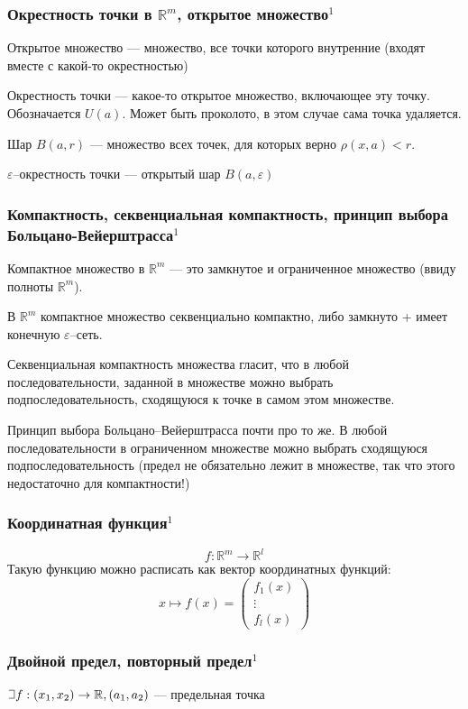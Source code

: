 \documentclass{article}
\def\letus{%
\mathord{\setbox0=\hbox{$\exists$}%
         \hbox{\kern 0.125\wd0%
               \vbox to \ht0{%
                  \hrule width 0.75\wd0%
                  \vfill%
                  \hrule width 0.75\wd0}%
               \vrule height \ht0%
               \kern 0.125\wd0}%
       }%
        }
\begin{document}
\subsubsection{Окрестность точки в \texorpdfstring{$\mathbb{R}^m$}{R\^m}, открытое множество\texorpdfstring{$^1$}{}}
Открытое множество --- множество, все точки которого внутренние (входят вместе с какой-то окрестностью)

Окрестность точки --- какое-то открытое множество, включающее эту точку. Обозначается $U(a)$. Может быть проколото, в этом случае сама точка удаляется. 

Шар $B(a, r)$ --- множество всех точек, для которых верно $\rho(x, a) < r$.

$\varepsilon$--окрестность точки --- открытый шар $B(a, \varepsilon)$

\subsubsection{Компактность, секвенциальная компактность, принцип выбора Больцано-Вейерштрасса\texorpdfstring{$^1$}{}}
Компактное множество в $\mathbb{R}^m$ --- это замкнутое и ограниченное множество (ввиду полноты $\mathbb{R}^m$).

В $\mathbb{R}^m$ компактное множество секвенциально компактно, либо замкнуто + имеет конечную $\varepsilon$--сеть.

Секвенциальная компактность множества гласит, что в любой последовательности, заданной в множестве можно выбрать подпоследовательность, сходящуюся к точке в самом этом множестве.

Принцип выбора Больцано--Вейерштрасса почти про то же. В любой последовательности в ограниченном множестве можно выбрать сходящуюся подпоследовательность (предел не обязательно лежит в множестве, так что этого недостаточно для компактности!)

\subsubsection{Координатная функция\texorpdfstring{$^1$}{}}
$$
f: \mathbb{R}^m \rightarrow \mathbb{R}^l
$$
Такую функцию можно расписать как вектор координатных функций:
$$
x \mapsto f(x) = \left(\begin{array}{c}
     f_1(x) \\
     \vdots \\
     f_l(x)
\end{array} \right)
$$

\subsubsection{Двойной предел, повторный предел\texorpdfstring{$^1$}{}}
$\letus f: (x_1, x_2) \rightarrow \mathbb{R}, (a_1, a_2)$ --- предельная точка
\end{document}
